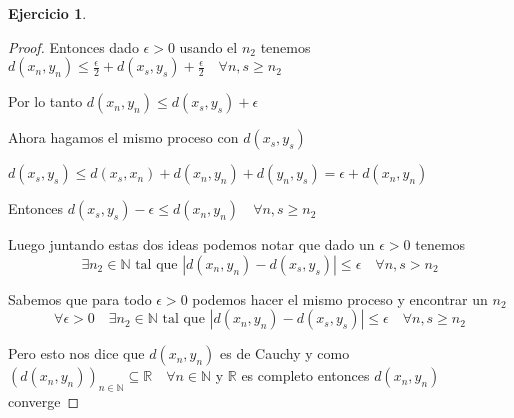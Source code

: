 \documentclass[12pt]{report}
\newcommand{\R}{\mathbb{R}}
\newcommand{\N}{\mathbb{N}}
\theoremstyle{definition}
\newtheorem{ej}{Ejercicio}
\begin{document}
\begin{ej}
\begin{enumerate}
\begin{proof}
	Entonces dado $\epsilon > 0$ usando el $n_2$ tenemos $d(x_n,y_n) \leq \frac{\epsilon}{2} + d(x_s,y_s) + \frac{\epsilon}{2} \quad \forall n,s \geq n_2$

	Por lo tanto $d(x_n,y_n) \leq d(x_s,y_s) + \epsilon$ 
	
	Ahora hagamos el mismo proceso con $d(x_s,y_s)$ 

	$d(x_s,y_s) \leq d(x_s,x_n) + d(x_n,y_n) + d(y_n,y_s) = \epsilon + d(x_n,y_n)$

	Entonces $d(x_s,y_s) - \epsilon \leq d(x_n,y_n) \quad \forall n,s \geq n_2$
      
     Luego juntando estas dos ideas podemos notar que dado un $\epsilon > 0$ tenemos
     $$\exists n_2 \in \N \text{ tal que } |d(x_n,y_n) - d(x_s,y_s)| \leq \epsilon \quad \forall n,s > n_2$$ 

   Sabemos que para todo $\epsilon > 0$ podemos hacer el mismo proceso y encontrar un $n_2$ 
 $$\forall \epsilon > 0 \quad \exists n_2 \in \N \text{ tal que } |d(x_n,y_n) - d(x_s,y_s)| \leq \epsilon \quad \forall n,s \geq n_2$$ 

 Pero esto nos dice que $d(x_n,y_n)$ es de Cauchy y como $(d(x_n,y_n))_{n\in\N} \subseteq \R \quad \forall n \in \N$ y $\R$ es completo entonces $d(x_n,y_n)$ converge

      \end{proof}
  \end{enumerate}
\end{ej}
\end{document}
